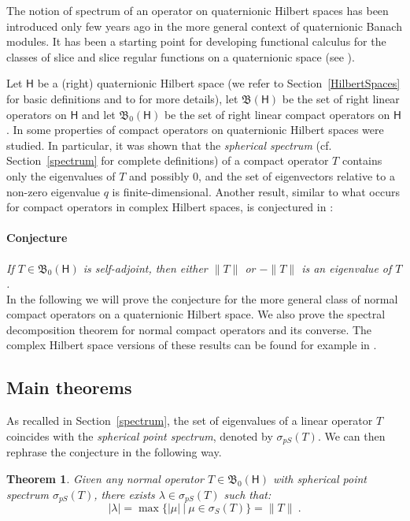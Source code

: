 \documentclass{birkmult}
\newtheorem{theorem}{Theorem}[section]
\theoremstyle{definition}
\theoremstyle{remark}
\numberwithin{equation}{section}
\begin{document}
The notion of spectrum of an operator on quaternionic Hilbert spaces has been introduced only few years ago \cite{libroverde} in the more general context of quaternionic Banach modules. It has been a starting point for developing  functional calculus for the classes of slice and slice regular functions on a quaternionic space (see \cite{libroverde,GhMoPe}).

Let ${\mathsf{H}}$ be  a (right) quaternionic Hilbert space (we refer to Section~\ref{HilbertSpaces} for basic defi\-nitions and to \cite{GhMoPe} for more details), let ${{\mathfrak B}}({\mathsf{H}})$ be the set of right linear operators on  ${\mathsf{H}}$ and  let ${{\mathfrak B}}_0({\mathsf{H}})$ be the set of right linear compact operators on  ${\mathsf{H}}$.  In \cite{Fashandi2} some properties of compact operators on quaternionic Hilbert spaces were studied. In particular, it was shown that the \emph{spherical spectrum} (cf. Section~\ref{spectrum} for complete definitions) of a compact operator $T$ contains only the eigenvalues of $T$ and possibly 0, and the set of eigenvectors relative to a non-zero eigenvalue $q$ is finite-dimensional.
Another result, similar to what occurs for compact operators in complex Hilbert spaces,  is conjectured in \cite{Fashandi2}:
\paragraph{Conjecture} \textit{If $T\in{{\mathfrak B}}_0({\mathsf{H}})$ is self-adjoint, then either $\|T\|$ or $-\|T\|$ is an eigenvalue of $T$.}
\\
In the following we will prove the conjecture for the more general class of normal compact operators on a quaternionic Hilbert space. We also prove the spectral decomposition theorem for normal compact operators and its converse. The complex Hilbert space versions of these results can be found for example in \cite[\S3.3]{Analysisnow}.

\subsection{Main theorems}
As recalled in Section~\ref{spectrum}, the set of eigenvalues of a linear operator $T$ coincides with the \emph{spherical point spectrum}, denoted by $\sigma_{pS}(T)$. We can then rephrase the conjecture in the following way.

\begin{theorem}\label{MT}
Given any normal operator $T \in {{\mathfrak B}}_0({\mathsf{H}})$ with spherical point spectrum $\sigma_{pS}(T)$, there exists $\lambda \in \sigma_{pS}(T)$ 
such that:
\begin{equation} |\lambda| = \max\{|\mu| \:|\:   \mu \in \sigma_S(T) \}    = \|T\|\:.\label{mi}\end{equation}
\end{theorem}
\end{document}
